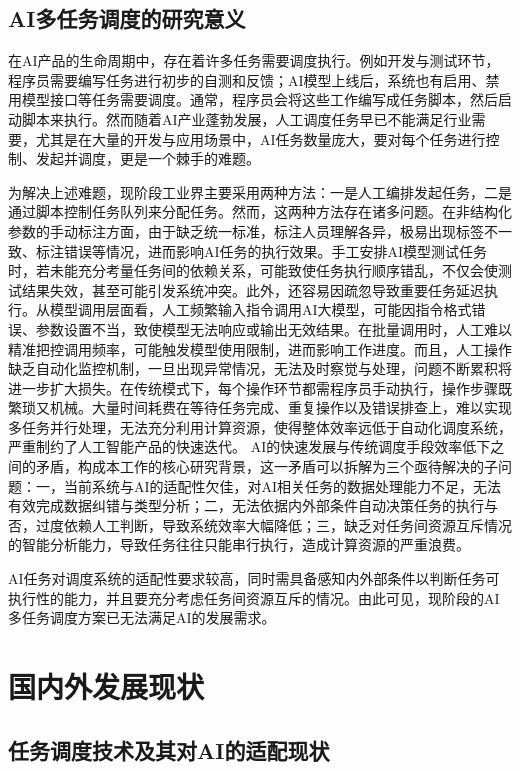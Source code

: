 \subsection{AI多任务调度的研究意义}

在AI产品的生命周期中，存在着许多任务需要调度执行。例如开发与测试环节，程序员需要编写任务进行初步的自测和反馈；AI模型上线后，系统也有启用、禁用模型接口等任务需要调度。通常，程序员会将这些工作编写成任务脚本，然后启动脚本来执行。然而随着AI产业蓬勃发展，人工调度任务早已不能满足行业需要，尤其是在大量的开发与应用场景中，AI任务数量庞大，要对每个任务进行控制、发起并调度，更是一个棘手的难题。 

为解决上述难题，现阶段工业界主要采用两种方法：一是人工编排发起任务，二是通过脚本控制任务队列来分配任务。然而，这两种方法存在诸多问题。在非结构化参数的手动标注方面，由于缺乏统一标准，标注人员理解各异，极易出现标签不一致、标注错误等情况，进而影响AI任务的执行效果。手工安排AI模型测试任务时，若未能充分考量任务间的依赖关系，可能致使任务执行顺序错乱，不仅会使测试结果失效，甚至可能引发系统冲突。此外，还容易因疏忽导致重要任务延迟执行。从模型调用层面看，人工频繁输入指令调用AI大模型，可能因指令格式错误、参数设置不当，致使模型无法响应或输出无效结果。在批量调用时，人工难以精准把控调用频率，可能触发模型使用限制，进而影响工作进度。而且，人工操作缺乏自动化监控机制，一旦出现异常情况，无法及时察觉与处理，问题不断累积将进一步扩大损失。在传统模式下，每个操作环节都需程序员手动执行，操作步骤既繁琐又机械。大量时间耗费在等待任务完成、重复操作以及错误排查上，难以实现多任务并行处理，无法充分利用计算资源，使得整体效率远低于自动化调度系统，严重制约了人工智能产品的快速迭代。
AI的快速发展与传统调度手段效率低下之间的矛盾，构成本工作的核心研究背景，这一矛盾可以拆解为三个亟待解决的子问题：一，当前系统与AI的适配性欠佳，对AI相关任务的数据处理能力不足，无法有效完成数据纠错与类型分析；二，无法依据内外部条件自动决策任务的执行与否，过度依赖人工判断，导致系统效率大幅降低；三，缺乏对任务间资源互斥情况的智能分析能力，导致任务往往只能串行执行，造成计算资源的严重浪费。

AI任务对调度系统的适配性要求较高，同时需具备感知内外部条件以判断任务可执行性的能力，并且要充分考虑任务间资源互斥的情况。由此可见，现阶段的AI多任务调度方案已无法满足AI的发展需求。

\section{国内外发展现状}

\subsection{任务调度技术及其对AI的适配现状}

